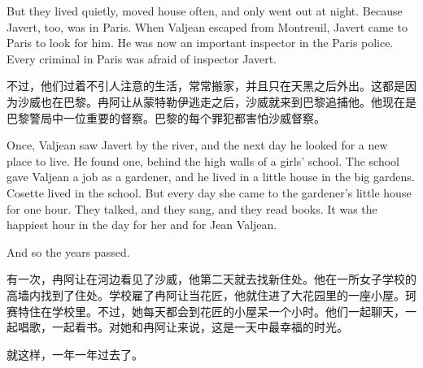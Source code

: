 \documentclass[fontset=ubuntu, zihao=5]{ctexart}
\begin{document}
\begin{paracol}{2}
  But they lived quietly, moved house often, and only went out at night. Because Javert, too, was in Paris. When Valjean escaped from Montreuil, Javert came to Paris to look for him. He was now an important inspector in the Paris police. Every criminal in Paris was afraid of inspector Javert.

  \switchcolumn

  不过，他们过着不引人注意的生活，常常搬家，并且只在天黑之后外出。这都是因为沙威也在巴黎。冉阿让从蒙特勒伊逃走之后，沙威就来到巴黎追捕他。他现在是巴黎警局中一位重要的督察。巴黎的每个罪犯都害怕沙威督察。

  \switchcolumn*

  Once, Valjean saw Javert by the river, and the next day he looked for a new place to live. He found one, behind the high walls of a girls' school. The school gave Valjean a job as a gardener, and he lived in a little house in the big gardens. Cosette lived in the school. But every day she came to the gardener's little house for one hour. They talked, and they sang, and they read books. It was the happiest hour in the day for her and for Jean Valjean.

  And so the years passed.

  \switchcolumn

  有一次，冉阿让在河边看见了沙威，他第二天就去找新住处。他在一所女子学校的高墙内找到了住处。学校雇了冉阿让当花匠，他就住进了大花园里的一座小屋。珂赛特住在学校里。不过，她每天都会到花匠的小屋呆一个小时。他们一起聊天，一起唱歌，一起看书。对她和冉阿让来说，这是一天中最幸福的时光。

  就这样，一年一年过去了。

\end{paracol}
\end{document}
